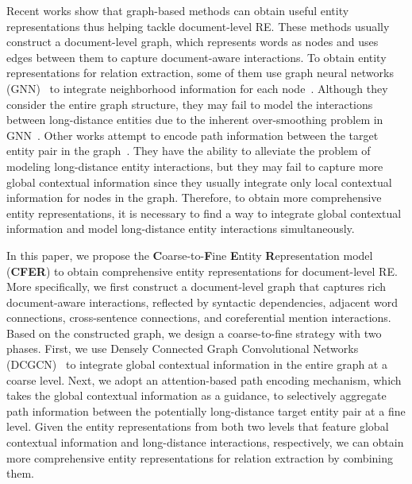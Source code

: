 \documentclass[letterpaper]{article} \usepackage{aaai21}  \usepackage{times}  \usepackage{helvet} \usepackage{courier}  \usepackage[hyphens]{url}  \usepackage{graphicx} \urlstyle{rm} \def\UrlFont{\rm}  \usepackage{natbib}  \usepackage{caption} \frenchspacing  \setlength{\pdfpagewidth}{8.5in}  \setlength{\pdfpageheight}{11in}
\begin{document}
Recent works show that graph-based methods can obtain useful entity representations thus helping tackle document-level RE. 
These methods usually construct a document-level graph, which represents words as nodes and uses edges between them to capture document-aware interactions. 
To obtain entity representations for relation extraction, some of them use  graph neural networks (GNN)~\citep{labelled_edge_gcn,dcgcn} to integrate neighborhood information for each node~\citep{gcnn,lsr}. 
Although they consider the entire graph structure, they may fail to model the interactions between long-distance entities due to the inherent over-smoothing problem in GNN~\citep{over_smoothing}. 
Other works attempt to encode path information between the target entity pair in the graph~\citep{quirk_and_poon,idepnn,eog}. 
They have the ability to alleviate the problem of modeling long-distance entity interactions, but they may fail to capture more global contextual information since they usually integrate only local contextual information for nodes in the graph. 
Therefore, to obtain more comprehensive entity representations, it is necessary to find a way to integrate global contextual information and model long-distance entity interactions simultaneously. 

In this paper, we propose the \textbf{C}oarse-to-\textbf{F}ine \textbf{E}ntity \textbf{R}epresentation model (\textbf{CFER}) to obtain comprehensive entity representations for document-level RE. 
More specifically, we first construct a document-level graph that captures rich document-aware interactions, reflected by syntactic dependencies, adjacent word connections, cross-sentence connections, and coreferential mention interactions. 
Based on the constructed graph, we design a coarse-to-fine strategy with two phases. 
First, we use Densely Connected Graph Convolutional Networks (DCGCN)~\citep{dccnn,dcgcn} to integrate global contextual information in the entire graph at a coarse level. 
Next, we adopt an attention-based path encoding mechanism, which takes the global contextual information as a guidance, to selectively aggregate path information between the potentially long-distance target entity pair at a fine level. 
Given the entity representations from both two levels that feature global contextual information and long-distance interactions, respectively, we can obtain more comprehensive entity representations for relation extraction by combining them. 
\end{document}
